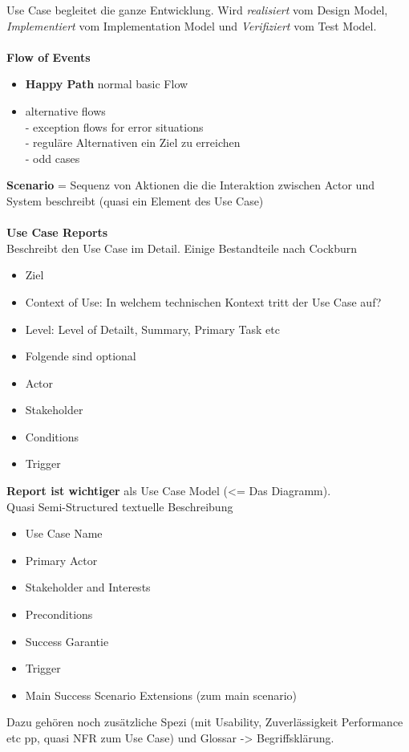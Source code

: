 Use Case begleitet die ganze Entwicklung. Wird \textit{realisiert} vom Design Model, \textit{Implementiert} vom Implementation Model und \textit{Verifiziert} vom Test Model.\\
\\
\textbf{Flow of Events}
\begin{itemize}
	\item \textbf{Happy Path} normal basic Flow
	\item alternative flows\\
	- exception flows for error situations\\
	- reguläre Alternativen ein Ziel zu erreichen\\
	- odd cases
\end{itemize}
\textbf{Scenario} = Sequenz von Aktionen die die Interaktion zwischen Actor und System beschreibt (quasi ein Element des Use Case)\\
\\
\textbf{Use Case Reports}\\
Beschreibt den Use Case im Detail. Einige Bestandteile nach Cockburn
\begin{itemize}
	\item Ziel
	\item Context of Use:  In welchem technischen Kontext tritt der Use Case auf?
	\item Level: Level of Detailt, Summary, Primary Task etc
	\item Folgende sind optional
	\item Actor
	\item Stakeholder
	\item Conditions
	\item Trigger
\end{itemize}
\textbf{Report ist wichtiger} als Use Case Model (<= Das Diagramm).
\\
Quasi Semi-Structured textuelle Beschreibung
\begin{itemize}
	\item Use Case Name
	\item Primary Actor
	\item Stakeholder and Interests
	\item Preconditions
	\item Success Garantie
	\item Trigger
	\item Main Success Scenario
	\items Extensions (zum main scenario)
\end{itemize}


Dazu gehören noch zusätzliche Spezi (mit Usability, Zuverlässigkeit Performance etc pp, quasi NFR zum Use Case) und Glossar -> Begriffsklärung. 

